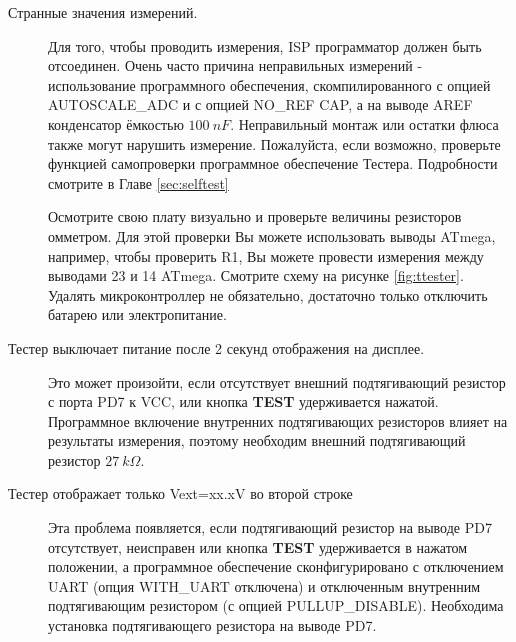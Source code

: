 \begin{description}
\item[Странные значения измерений.]
Для того, чтобы проводить измерения, ISP программатор должен быть отсоединен. Очень часто причина неправильных 
измерений - использование программного обеспечения, скомпилированного с опцией AUTOSCALE\_ADC и с опцией NO\_REF CAP, 
а на выводе AREF конденсатор ёмкостью \(100~nF\). Неправильный монтаж или остатки флюса также могут нарушить 
измерение. Пожалуйста, если возможно, проверьте функцией самопроверки программное обеспечение Тестера. Подробности 
смотрите в Главе \ref{sec:selftest}

Осмотрите свою плату визуально и проверьте величины резисторов омметром. Для этой проверки Вы можете использовать 
выводы ATmega, например, чтобы проверить R1, Вы можете провести измерения между выводами 23 и 14 ATmega. Смотрите 
схему на рисунке \ref{fig:ttester}. Удалять микроконтроллер не обязательно, достаточно только отключить батарею 
или электропитание.

\item[Тестер выключает питание после 2 секунд отображения на дисплее.] 
Это может произойти, если отсутствует внешний подтягивающий резистор с порта PD7 к VCC, или кнопка \textbf{ TEST} 
удерживается нажатой. Программное включение внутренних подтягивающих резисторов влияет на результаты измерения, 
поэтому необходим внешний подтягивающий резистор \(27~k\Omega\). 

\item[Тестер отображает только Vext=xx.xV во второй строке]
Эта проблема появляется, если подтягивающий резистор на выводе PD7
отсутствует, неисправен или кнопка \textbf{ TEST} удерживается в нажатом положении,
а программное обеспечение сконфигурировано с отключением UART (опция WITH\_UART отключена)
и отключенным внутренним подтягивающим резистором (с опцией PULLUP\_DISABLE). 
Необходима установка подтягивающего резистора на выводе PD7.

\end{description}
